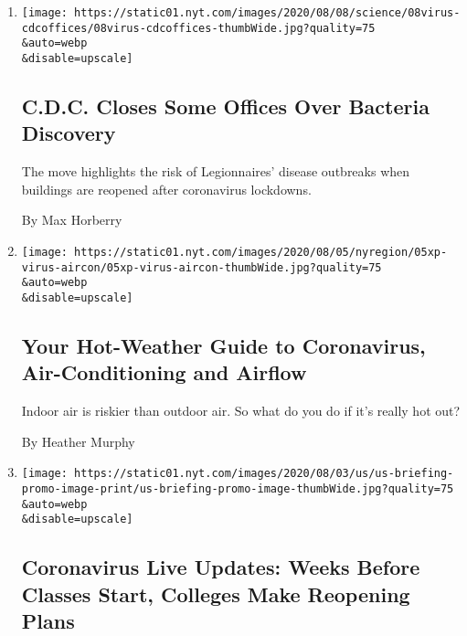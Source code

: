 \begin{enumerate}
\def\labelenumi{\arabic{enumi}.}
\item
  \href{/2020/08/08/health/cdc-legionnaires-coronavirus.html}{}

  \texttt{[image: https://static01.nyt.com/images/2020/08/08/science/08virus-cdcoffices/08virus-cdcoffices-thumbWide.jpg?quality=75\\\&auto=webp\\\&disable=upscale]}

  \hypertarget{cdc-closes-some-offices-over-bacteria-discovery}{%
  \subsection{C.D.C. Closes Some Offices Over Bacteria
  Discovery}\label{cdc-closes-some-offices-over-bacteria-discovery}}

  The move highlights the risk of Legionnaires' disease outbreaks when
  buildings are reopened after coronavirus lockdowns.

  By Max Horberry
\item
  \href{/2020/08/08/science/coronavirus-spread-air-conditioning.html}{}

  \texttt{[image: https://static01.nyt.com/images/2020/08/05/nyregion/05xp-virus-aircon/05xp-virus-aircon-thumbWide.jpg?quality=75\\\&auto=webp\\\&disable=upscale]}

  \hypertarget{your-hot-weather-guide-to-coronavirus-air-conditioning-and-airflow}{%
  \subsection{Your Hot-Weather Guide to Coronavirus, Air-Conditioning
  and
  Airflow}\label{your-hot-weather-guide-to-coronavirus-air-conditioning-and-airflow}}

  Indoor air is riskier than outdoor air. So what do you do if it's
  really hot out?

  By Heather Murphy
\item
  \href{/2020/08/08/world/coronavirus-updates.html}{}

  \texttt{[image: https://static01.nyt.com/images/2020/08/03/us/us-briefing-promo-image-print/us-briefing-promo-image-thumbWide.jpg?quality=75\\\&auto=webp\\\&disable=upscale]}

  \hypertarget{coronavirus-live-updates-weeks-before-classes-start-colleges-make-reopening-plans}{%
  \subsection{Coronavirus Live Updates: Weeks Before Classes Start,
  Colleges Make Reopening
  Plans}\label{coronavirus-live-updates-weeks-before-classes-start-colleges-make-reopening-plans}}


\end{enumerate}
